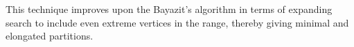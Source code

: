 This technique improves upon the Bayazit's algorithm \cite{Bayazit} in terms of expanding search to include even extreme vertices in the range, thereby giving minimal and elongated partitions.
%
%
%


\def\partitioncomparisionraise{0.08}
\def\partitioncomparisionfig{0.98}

